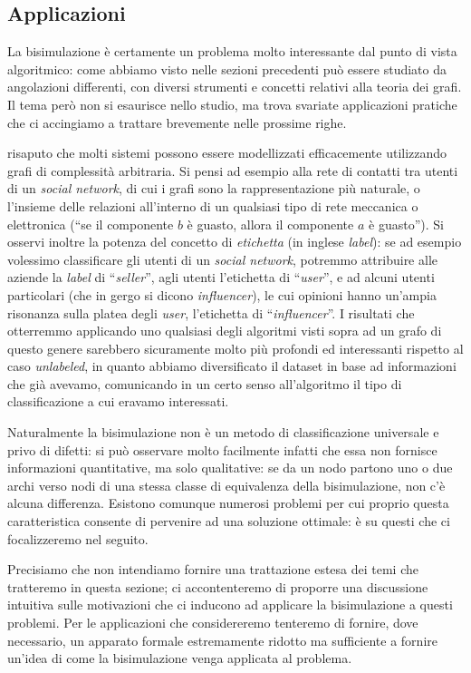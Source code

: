 \subsection{Applicazioni}
\label{sec:applitations}
La bisimulazione è certamente un problema molto interessante dal punto di vista algoritmico: come abbiamo visto nelle sezioni precedenti può essere studiato da angolazioni differenti, con diversi strumenti e concetti relativi alla teoria dei grafi. Il tema però non si esaurisce nello studio, ma trova svariate applicazioni pratiche che ci accingiamo a trattare brevemente nelle prossime righe.

\accente risaputo che molti sistemi possono essere modellizzati efficacemente utilizzando grafi di complessità arbitraria. Si pensi ad esempio alla rete di contatti tra utenti di un \emph{social network}, di cui i grafi sono la rappresentazione più naturale, o l'insieme delle relazioni all'interno di un qualsiasi tipo di rete meccanica o elettronica (``se il componente $b$ è guasto, allora il componente $a$ è guasto''). Si osservi inoltre la potenza del concetto di \emph{etichetta} (in inglese \emph{label}): se ad esempio volessimo classificare gli utenti di un \emph{social network}, potremmo attribuire alle aziende la \emph{label} di ``\emph{seller}'', agli utenti l'etichetta di ``\emph{user}'', e ad alcuni utenti particolari (che in gergo si dicono \emph{influencer}), le cui opinioni hanno un'ampia risonanza sulla platea degli \emph{user}, l'etichetta di ``\emph{influencer}''. I risultati che otterremmo applicando uno qualsiasi degli algoritmi visti sopra ad un grafo di questo genere sarebbero sicuramente molto più profondi ed interessanti rispetto al caso \emph{unlabeled}, in quanto abbiamo diversificato il dataset in base ad informazioni che già avevamo, comunicando in un certo senso all'algoritmo il tipo di classificazione a cui eravamo interessati.

Naturalmente la bisimulazione non è un metodo di classificazione universale e privo di difetti: si può osservare molto facilmente infatti che essa non fornisce informazioni quantitative, ma solo qualitative: se da un nodo partono uno o due archi verso nodi di una stessa classe di equivalenza della bisimulazione, non c'è alcuna differenza. Esistono comunque numerosi problemi per cui proprio questa caratteristica consente di pervenire ad una soluzione ottimale: è su questi che ci focalizzeremo nel seguito.

Precisiamo che non intendiamo fornire una trattazione estesa dei temi che tratteremo in questa sezione; ci accontenteremo di proporre una discussione intuitiva sulle motivazioni che ci inducono ad applicare la bisimulazione a questi problemi. Per le applicazioni che considereremo tenteremo di fornire, dove necessario, un apparato formale estremamente ridotto ma sufficiente a fornire un'idea di come  la bisimulazione venga applicata al problema.

